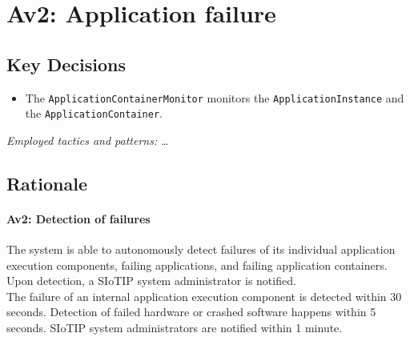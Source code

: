 \section{Av2: Application failure}


    \subsection*{Key Decisions}



        \begin{itemize}
        	\item The \texttt{ApplicationContainerMonitor} monitors the \texttt{ApplicationInstance} and the \texttt{ApplicationContainer}.\\
        \end{itemize}
        \emph{Employed tactics and patterns:} \ldots

    \subsection*{Rationale}
        \paragraph{Av2: Detection of failures}
            The system is able to autonomously detect failures of its individual
            application execution components, failing applications, and failing application containers. \\
            Upon detection, a SIoTIP system administrator is notified. \\
            The failure of an internal application execution component is detected within 30 seconds.
            Detection of failed hardware or crashed software happens within 5 seconds.
            SIoTIP system administrators are notified within 1 minute.\\
            
